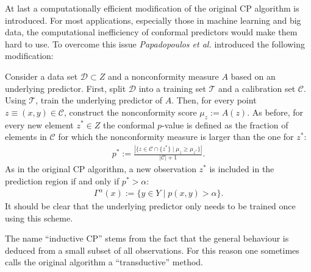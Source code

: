     At last a computationally efficient modification of the original CP algorithm is introduced. For most applications, especially those in machine learning and big data, the computational inefficiency of conformal predictors would make them hard to use. To overcome this issue \textit{Papadopoulos et al.} introduced the following modification:
    \begin{construct}[Inductive CP]
        Consider a data set $\mathcal{D}\subset Z$ and a nonconformity measure $A$ based on an underlying predictor. First, split $\mathcal{D}$ into a training set $\mathcal{T}$ and a calibration set $\mathcal{C}$. Using $\mathcal{T}$, train the underlying predictor of $A$. Then, for every point $z\equiv(x,y)\in\mathcal{C}$, construct the nonconformity score $\mu_z := A(z)$. As before, for every new element $z^*\in Z$ the conformal $p$-value is defined as the fraction of elements in $\mathcal{C}$ for which the nonconformity measure is larger than the one for $z^*$:
        \begin{gather}
            \label{data:icp}
            p^* := \frac{|\{z\in\mathcal{C}\cap\{z^*\}\mid\mu_z\geq\mu_{z^*}\}|}{|\mathcal{C}|+1}.
       \end{gather}
        As in the original CP algorithm, a new observation $z^*$ is included in the prediction region if and only if $p^*>\alpha$:
        \begin{gather}
            \label{data:icp2}
            \Gamma^\alpha(x) := \{y\in Y\mid p(x,y)>\alpha\}.
        \end{gather}
        It should be clear that the underlying predictor only needs to be trained once using this scheme.
    \end{construct}
    \begin{remark}[Terminology]
        The name ``inductive CP'' stems from the fact that the general behaviour is deduced from a small subset of all observations. For this reason one sometimes calls the original algorithm a ``transductive'' method.
    \end{remark}

